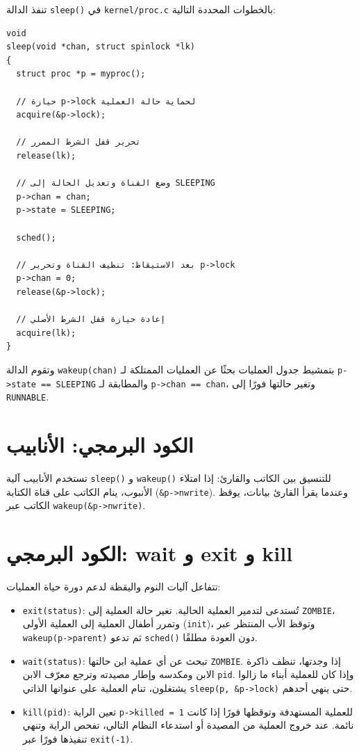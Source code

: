 تنفذ الدالة \texttt{sleep()} في \texttt{kernel/proc.c} بالخطوات المحددة التالية:
\begin{lstlisting}
void
sleep(void *chan, struct spinlock *lk)
{
  struct proc *p = myproc();
  
  // حيازة p->lock لحماية حالة العملية
  acquire(&p->lock);
  
  // تحرير قفل الشرط الممرر
  release(lk);

  // وضع القناة وتعديل الحالة إلى SLEEPING
  p->chan = chan;
  p->state = SLEEPING;

  sched();

  // بعد الاستيقاظ: تنظيف القناة وتحرير p->lock
  p->chan = 0;
  release(&p->lock);

  // إعادة حيازة قفل الشرط الأصلي
  acquire(lk);
}
\end{lstlisting}

وتقوم الدالة \texttt{wakeup(chan)} بتمشيط جدول العمليات بحثًا عن العمليات الممتلكة لـ \texttt{p->state == SLEEPING} والمطابقة لـ \texttt{p->chan == chan}، وتغير حالتها فورًا إلى \texttt{RUNNABLE}.

\section{الكود البرمجي: الأنابيب}
\label{sec:code_pipes_sleep}

تستخدم الأنابيب آلية \texttt{sleep()} و \texttt{wakeup()} للتنسيق بين الكاتب والقارئ:
إذا امتلاء الأنبوب، ينام الكاتب على قناة الكتابة (\texttt{\&p->nwrite}). وعندما يقرأ القارئ بيانات، يوقظ الكاتب عبر \texttt{wakeup(\&p->nwrite)}.

\section{الكود البرمجي: wait و exit و kill}
\label{sec:code_wait_exit_kill}

تتفاعل آليات النوم واليقظة لدعم دورة حياة العمليات:
\begin{itemize}
  \item \texttt{exit(status)}: تُستدعى لتدمير العملية الحالية. تغير حالة العملية إلى \texttt{ZOMBIE}، وتمرر أطفال العملية إلى العملية الأولى (\texttt{init})، وتوقظ الأب المنتظر عبر \texttt{wakeup(p->parent)} ثم تدعو \texttt{sched()} دون العودة مطلقًا.
  \item \texttt{wait(status)}: تبحث عن أي عملية ابن حالتها \texttt{ZOMBIE}. إذا وجدتها، تنظف ذاكرة الابن ومكدسه وإطار مصيدته وترجع معرّف الابن \texttt{pid}. وإذا كان للعملية أبناء ما زالوا يشتغلون، تنام العملية على عنوانها الذاتي \texttt{sleep(p, \&p->lock)} حتى ينهي أحدهم.
  \item \texttt{kill(pid)}: تعين الراية \texttt{p->killed = 1} للعملية المستهدفة وتوقظها فورًا إذا كانت نائمة. عند خروج العملية من المصيدة أو استدعاء النظام التالي، تفحص الراية وتنهي تنفيذها فورًا عبر \texttt{exit(-1)}.
\end{itemize}

